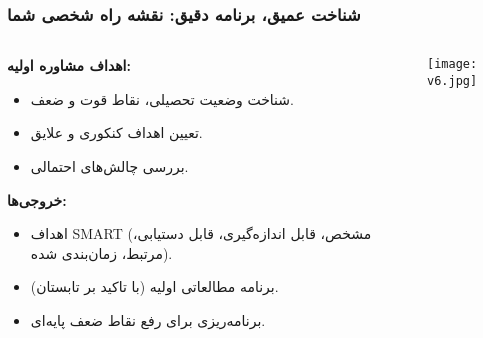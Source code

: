 \documentclass[aspectratio=169]{beamer}
\begin{document}
\begin{frame}[fragile]
  \frametitle{شناخت عمیق، برنامه دقیق: نقشه راه شخصی شما}

  \begin{columns}[T]
    \begin{column}{0.55\textwidth}
      \begin{flushright}
        \textbf{اهداف مشاوره اولیه:}
      \end{flushright}
      \begin{itemize}\setlength{\itemsep}{-1pt}
        \item شناخت وضعیت تحصیلی، نقاط قوت و ضعف.
        \item تعیین اهداف کنکوری و علایق.
        \item بررسی چالش‌های احتمالی.
      \end{itemize}
      \smallskip
      \begin{flushright}
        \textbf{خروجی‌ها:}
      \end{flushright}
      \begin{itemize}\setlength{\itemsep}{-1pt}
        \item اهداف SMART (مشخص، قابل اندازه‌گیری، قابل دستیابی، مرتبط، زمان‌بندی شده).
        \item برنامه مطالعاتی اولیه (با تاکید بر تابستان).
        \item برنامه‌ریزی برای رفع نقاط ضعف پایه‌ای.
      \end{itemize}
    \end{column}

    \begin{column}{0.4\textwidth}
      \texttt{[image: v6.jpg]}
    \end{column}
  \end{columns}
\end{frame}
\end{document}
